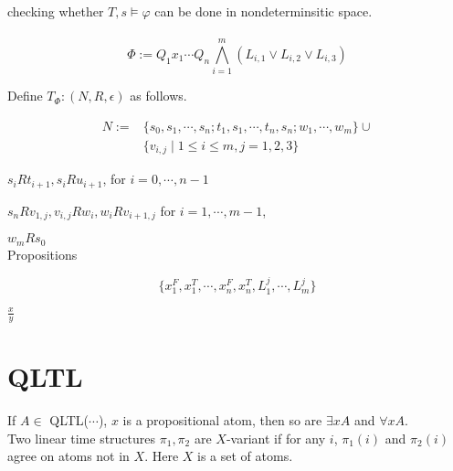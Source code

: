 \documentclass[12pt]{article}
\begin{document}
\begin{CJK*}{GBK}{song}
checking whether $T,s\models \varphi$ can be done in nondeterminsitic space.
\\ \ \\





$$\Phi:=Q_1x_1\cdots Q_n\bigwedge_{i=1}^m \left(L_{i,1}\vee L_{i,2}\vee L_{i,3}\right)$$

Define $T_{\Phi}:(N,R,\epsilon)$ as follows.


$$\begin{array}{ll}N:=&
\{s_0, s_1,\cdots, s_n; t_1,s_1,\cdots, t_n,s_n; w_1,\cdots, w_m\}\cup\\ & \{v_{i,j}\mid 1\leq i\leq m, j=1,2,3\}\end{array}$$


$s_iR t_{i+1}, s_iRu_{i+1}$, for $i=0,\cdots,n-1$

$s_nR v_{1,j}, v_{i,j}Rw_i, w_iRv_{i+1,j}$ for $i=1,\cdots,m-1$,

$w_mRs_0$ \\


Propositions

$$\{x_1^F, x_1^T, \cdots, x_n^F, x_n^T, L_1^j,\cdots, L_m^j\}$$


$\frac{x}{y}$

\section{QLTL}

If $A\in$ QLTL($\cdots$), $x$ is a propositional atom,  then so are 
$\exists x A$ and $\forall xA$.\\

Two linear time structures
$\pi_1,\pi_2$ are $X$-variant if for any $i$, $\pi_1(i)$ and $\pi_2(i)$ agree on atoms not in $X$. 
Here $X$ is a set of atoms.\\















\end{CJK*}
\end{document}
